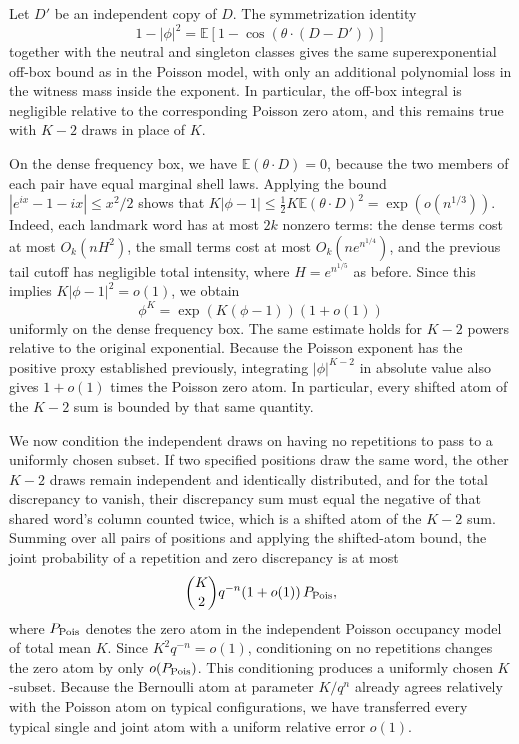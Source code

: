 Let \(D'\) be an independent copy of \(D\). The symmetrization identity
\[
 1-|\phi|^2=\mathbb E[1-\cos(\theta\cdot(D-D'))]
\]
together with the neutral and singleton classes gives the same superexponential off-box bound as in the Poisson model, with only an additional polynomial loss in the witness mass inside the exponent. In particular, the off-box integral is negligible relative to the corresponding Poisson zero atom, and this remains true with \(K-2\) draws in place of \(K\).

On the dense frequency box, we have \(\mathbb E(\theta\cdot D)=0\), because the two members of each pair have equal marginal shell laws. Applying the bound \(|e^{ix}-1-ix|\le x^2/2\) shows that
\(K|\phi-1|\le \tfrac12K\mathbb E(\theta\cdot D)^2
=\exp(o(n^{1/3}))\).
Indeed, each landmark word has at most \(2k\) nonzero terms: the dense terms cost at most \(O_k(nH^2)\), the small terms cost at most \(O_k(n e^{n^{1/4}})\), and the previous tail cutoff has negligible total intensity, where \(H=e^{n^{1/5}}\) as before. Since this implies \(K|\phi-1|^2=o(1)\), we obtain
\[
 \phi^K
  =\exp(K(\phi-1))(1+o(1))
\]
uniformly on the dense frequency box. The same estimate holds for \(K-2\) powers relative to the original exponential. Because the Poisson exponent has the positive proxy established previously, integrating \(|\phi|^{K-2}\) in absolute value also gives \(1+o(1)\) times the Poisson zero atom. In particular, every shifted atom of the \(K-2\) sum is bounded by that same quantity.

We now condition the independent draws on having no repetitions to pass to a uniformly chosen subset. If two specified positions draw the same word, the other \(K-2\) draws remain independent and identically distributed, and for the total discrepancy to vanish, their discrepancy sum must equal the negative of that shared word's column counted twice, which is a shifted atom of the \(K-2\) sum. Summing over all pairs of positions and applying the shifted-atom bound, the joint probability of a repetition and zero discrepancy is at most
\[
 \binom K2 q^{-n}(1+o(1))\,P_{\rm Pois},
\]
where \(P_{\rm Pois}\) denotes the zero atom in the independent Poisson occupancy model of total mean \(K\). Since \(K^2q^{-n}=o(1)\), conditioning on no repetitions changes the zero atom by only \(o(P_{\rm Pois})\). This conditioning produces a uniformly chosen \(K\)-subset. Because the Bernoulli atom at parameter \(K/q^n\) already agrees relatively with the Poisson atom on typical configurations, we have transferred every typical single and joint atom with a uniform relative error \(o(1)\).

